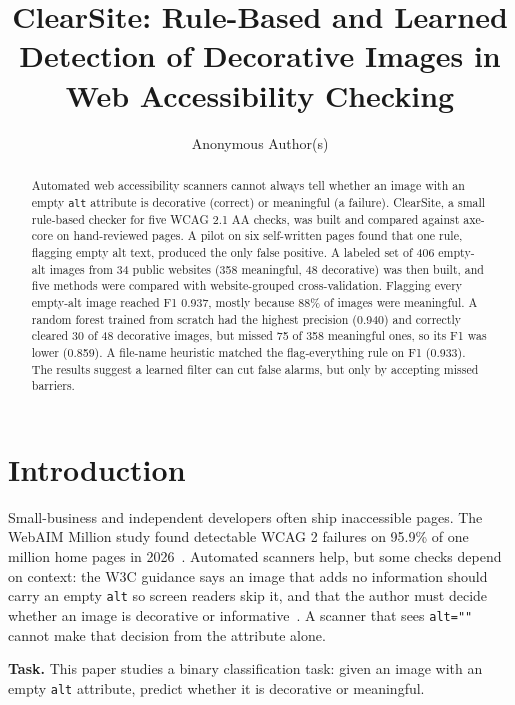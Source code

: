 \documentclass[sigconf,anonymous]{acmart}
\begin{document}
\title{ClearSite: Rule-Based and Learned Detection of Decorative Images in Web Accessibility Checking}

\author{Anonymous Author(s)}

\begin{abstract}
Automated web accessibility scanners cannot always tell whether an image with an empty \texttt{alt} attribute is decorative (correct) or meaningful (a failure). ClearSite, a small rule-based checker for five WCAG 2.1 AA checks, was built and compared against axe-core on hand-reviewed pages. A pilot on six self-written pages found that one rule, flagging empty alt text, produced the only false positive. A labeled set of 406 empty-alt images from 34 public websites (358 meaningful, 48 decorative) was then built, and five methods were compared with website-grouped cross-validation. Flagging every empty-alt image reached F1 0.937, mostly because 88\% of images were meaningful. A random forest trained from scratch had the highest precision (0.940) and correctly cleared 30 of 48 decorative images, but missed 75 of 358 meaningful ones, so its F1 was lower (0.859). A file-name heuristic matched the flag-everything rule on F1 (0.933). The results suggest a learned filter can cut false alarms, but only by accepting missed barriers.
\end{abstract}

\maketitle

\section{Introduction}
Small-business and independent developers often ship inaccessible pages. The WebAIM Million study found detectable WCAG 2 failures on 95.9\% of one million home pages in 2026~\cite{webaim2026}. Automated scanners help, but some checks depend on context: the W3C guidance says an image that adds no information should carry an empty \texttt{alt} so screen readers skip it, and that the author must decide whether an image is decorative or informative~\cite{w3cdecorative}. A scanner that sees \texttt{alt=""} cannot make that decision from the attribute alone.

\textbf{Task.} This paper studies a binary classification task: given an image with an empty \texttt{alt} attribute, predict whether it is decorative or meaningful. 
\end{document}
